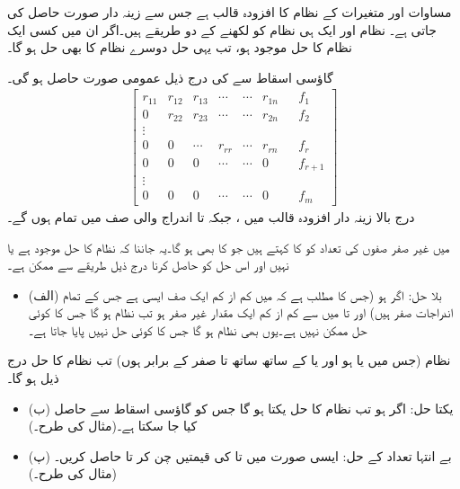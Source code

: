  مساوات اور  متغیرات کے نظام کا افزودہ قالب  ہے جس سے  زینہ دار صورت
  حاصل کی جاتی ہے۔ نظام  اور  ایک ہی نظام کو لکھنے کے دو طریقے ہیں۔اگر ان میں کسی ایک نظام کا حل موجود ہو، تب یہی حل دوسرے نظام کا  بھی حل ہو گا۔

گاؤسی اسقاط سے   کی درج ذیل عمومی صورت حاصل ہو گی۔
\begin{align*}
\begin{bmatrix}
r_{11}&r_{12}&r_{13}&\cdots&\cdots&r_{1n}&&f_1\\
0&r_{22}&r_{23}&\cdots&\cdots&r_{2n}&&f_2\\
\vdots\\
0&0&\cdots&r_{rr}&\cdots&r_{rn}&&f_r\\
0&0&0&\cdots&\cdots&0&&f_{r+1}\\
\vdots\\
0&0&0&\cdots&\cdots&0&&f_m
\end{bmatrix}
\end{align*} 
درج بالا زینہ دار افزودہ قالب میں ،   جبکہ   تا  اندراج والی صف میں تمام  ہوں گے۔

  میں غیر صفر صفوں کی تعداد  کو  کا  کہتے ہیں جو  کا بھی  ہو گا۔یہ جاننا کہ نظام  کا حل موجود ہے یا نہیں اور اس حل کو حاصل کرنا درج ذیل طریقے سے ممکن ہے۔
\begin{itemize}
\item{(الف) بلا حل:}
اگر  ہو (جس کا مطلب ہے کہ  میں کم از کم ایک صف ایسی ہے جس کے تمام اندراجات صفر  ہیں) اور  تا  میں سے کم از کم ایک مقدار غیر صفر ہو تب   نظام ہو گا جس کا کوئی حل ممکن نہیں ہے۔یوں  بھی  نظام ہو گا جس کا کوئی حل نہیں پایا جاتا ہے۔ 
\end{itemize}
 نظام (جس میں یا  ہو اور یا  کے ساتھ ساتھ  تا  صفر کے برابر ہوں) تب نظام کا حل درج ذیل ہو گا۔
\begin{itemize}
\item{(ب) یکتا حل:}
اگر  ہو تب نظام کا حل یکتا ہو گا جس کو گاؤسی اسقاط سے حاصل کیا جا سکتا ہے۔(مثال  کی طرح۔) 
\item{(پ) بے انتہا تعداد کے حل:}
ایسی صورت میں  تا  کی  قیمتیں چن کر  تا  حاصل کریں۔(مثال  کی طرح۔)
\end{itemize}

